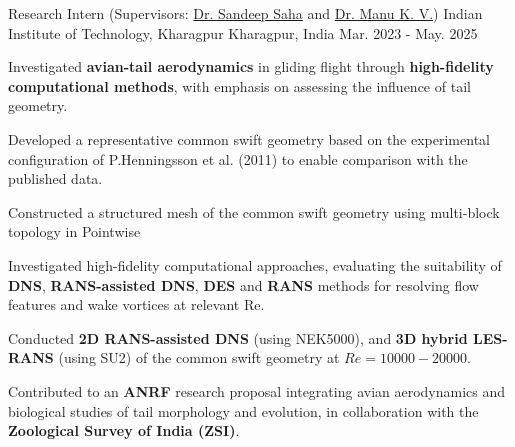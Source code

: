 \begin{cventries}
  \cventry
  {Research Intern (Supervisors: \href{https://www.iitkgp.ac.in/department/AE/faculty/ae-ssaha}{Dr. Sandeep Saha} and \href{https://www.iist.ac.in/people-faculty-profile/manu-k-v}{Dr. Manu K. V.})} %
  {Indian Institute of Technology, Kharagpur} %
  {Kharagpur, India} %
  {Mar. 2023 - May. 2025} %
  {
    \begin{cvitems} %
      \item {Investigated \textbf{avian-tail aerodynamics} in gliding flight through \textbf{high-fidelity computational methods}, with emphasis on assessing the influence of tail geometry.}
      \item {Developed a representative common swift geometry based on the experimental configuration of P.Henningsson et al. (2011) to enable comparison with the published data.}
      \item {Constructed a structured mesh of the common swift geometry using multi-block topology in Pointwise}
      \item {Investigated high-fidelity computational approaches, evaluating the suitability of \textbf{DNS}, \textbf{RANS-assisted DNS}, \textbf{DES} and \textbf{RANS} methods for resolving flow features and wake vortices at relevant Re.}
      \item {Conducted \textbf{2D RANS-assisted DNS} (using NEK5000), and \textbf{3D hybrid LES-RANS} (using SU2) of the common swift geometry at $Re = 10000 - 20000$.}
      \item {Contributed to an \textbf{ANRF} research proposal integrating avian aerodynamics and biological studies of tail morphology and evolution, in collaboration with the \textbf{Zoological Survey of India (ZSI)}.}
    \end{cvitems}
  }
\end{cventries}
